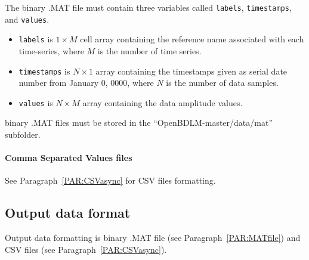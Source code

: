 \documentclass{article}
\begin{document}
The \MATLAB{} binary .MAT file must contain three \MATLAB{} variables called \lstinline[basicstyle = \mlttfamily \small]!labels!, \lstinline[basicstyle = \mlttfamily \small]!timestamps!, and \lstinline[basicstyle = \mlttfamily \small]!values!.
\begin{itemize}
\item \lstinline[basicstyle = \mlttfamily \small]!labels! is $1\times M$ cell array containing the reference name associated with each time-series, where $M$ is the number of time series.
\item \lstinline[basicstyle = \mlttfamily \small]!timestamps! is $N\times 1$ array containing the timestamps given as serial date number from January 0, 0000, where $N$ is the number of data samples.
\item \lstinline[basicstyle = \mlttfamily \small]!values! is $N\times M$ array containing the data amplitude values.
\end{itemize}
 \MATLAB{} binary .MAT files must be stored in the ``OpenBDLM-master/data/mat'' subfolder.

%
%
%

\paragraph{Comma Separated Values files}

See Paragraph~\ref{PAR:CSVasync} for CSV files formatting.



\subsection{Output data format}

Output data formatting is \MATLAB{} binary .MAT file (see Paragraph~\ref{PAR:MATfile}) and CSV files (see Paragraph~\ref{PAR:CSVasync}).
\end{document}
